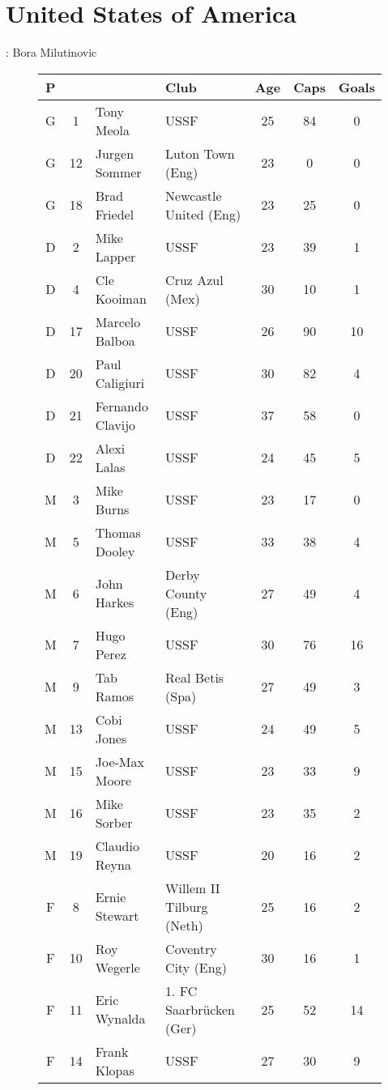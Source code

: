 \chapter{United States of America}
\newline
\newline
\Coach: Bora Milutinovic
\begin{figure}[H]
\begin{tabular}{c c l l c c c}
P & & & Club & Age & Caps & Goals \\ \hline
G & 1 & Tony Meola & USSF & 25 & 84 & 0 \\
G & 12 & Jurgen Sommer & Luton Town (Eng) & 23 & 0 & 0 \\
G & 18 & Brad Friedel & Newcastle United (Eng) & 23 & 25 & 0 \\ \hline
D & 2 & Mike Lapper & USSF & 23 & 39 & 1 \\
D & 4 & Cle Kooiman & Cruz Azul (Mex) & 30 & 10 & 1 \\
D & 17 & Marcelo Balboa & USSF & 26 & 90 & 10 \\
D & 20 & Paul Caligiuri & USSF & 30 & 82 & 4 \\
D & 21 & Fernando Clavijo & USSF & 37 & 58 & 0 \\
D & 22 & Alexi Lalas & USSF & 24 & 45 & 5 \\ \hline
M & 3 & Mike Burns & USSF & 23 & 17 & 0 \\
M & 5 & Thomas Dooley & USSF & 33 & 38 & 4 \\
M & 6 & John Harkes & Derby County (Eng) & 27 & 49 & 4 \\
M & 7 & Hugo Perez & USSF & 30 & 76 & 16 \\
M & 9 & Tab Ramos & Real Betis (Spa) & 27 & 49 & 3 \\
M & 13 & Cobi Jones & USSF & 24 & 49 & 5 \\
M & 15 & Joe-Max Moore & USSF & 23 & 33 & 9 \\
M & 16 & Mike Sorber & USSF & 23 & 35 & 2 \\
M & 19 & Claudio Reyna & USSF & 20 & 16 & 2 \\ \hline
F & 8 & Ernie Stewart & Willem II Tilburg (Neth) & 25 & 16 & 2 \\
F & 10 & Roy Wegerle & Coventry City (Eng) & 30 & 16 & 1 \\
F & 11 & Eric Wynalda & 1. FC Saarbr{\"u}cken (Ger) & 25 & 52 & 14 \\  %
F & 14 & Frank Klopas & USSF & 27 & 30 & 9 \\ \hline
\end{tabular}
\end{figure}
